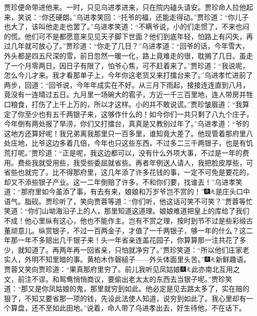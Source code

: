 贾珍便命带进他来。一时，只见乌进孝进来，只在院内磕头请安。贾珍命人拉他起来，笑说：``你还硬朗。''乌进孝笑回：``托爷的福，还能走得动。''贾珍道：``你儿子也大了，该叫他走走也罢了。''乌进孝笑道：``不瞒爷说，小的们走惯了，不来也闷的慌。他们可不是都愿意来见见天子脚下世面？他们到底年轻，怕路上有闪失，再过几年就可放心了。''贾珍道：``你走了几日？''乌进孝道：``回爷的话，今年雪大，外头都是四五尺深的雪，前日忽然一暖一化，路上竟难走的很，耽搁了几日。虽走了一个月零两日，因日子有限了，怕爷心焦，可不赶着来了。''贾珍道：``我说呢，怎么今儿才来。我才看那单子上，今年你这老货又来打擂台来了。''乌进孝忙进前了两步，回道：``回爷说，今年年成实在不好。从三月下雨起，接接连连直到八月，竟没有一连晴过五日。九月里一场碗大的雹子，方近一千三百里地，连人带房并牲口粮食，打伤了上千上万的，所以才这样。小的并不敢说谎。''贾珍皱眉道：``我算定了你至少也有五千两银子来，这够作什么的！如今你们一共只剩了八九个庄子，今年倒有两处报了旱涝，你们又打擂台，真真是又教别过年了。''乌进孝道：``爷的这地方还算好呢！我兄弟离我那里只一百多里，谁知竟大差了。他现管着那府里八处庄地，比爷这边多着几倍，今年也只这些东西，不过多二三千两银子，也是有饥荒打呢。''贾珍道：``正是呢，我这边都可以，没有什么外项大事，不过是一年的费用。费些我就受用些，我受些委屈就省些。再者年例送人请人，我把脸皮厚些，可省些也就完了。比不得那府里，这几年添了许多花钱的事，一定不可免是要花的，却又不添些银子产业。这一二年倒赔了许多，不和你们要，找谁去！''乌进孝笑道：``那府里如今虽添了事，有去有来，娘娘和万岁爷岂不赏的！''{\includegraphics[width=3mm]{../Images/00004}\includegraphics[width=3mm]{../Images/00012}\footnotesize \kaishu 是庄头口中语气。脂砚。}贾珍听了，笑向贾蓉等道：``你们听，他这话可笑不可笑？''贾蓉等忙笑道：``你们山坳海沿子上的人，那里知道这道理。娘娘难道把皇上的库给了我们不成！他心里纵有这心，他也不能作主。岂有不赏之理，按时到节不过是些彩缎古董顽意儿。纵赏银子，不过一百两金子，才值了一千两银子，够一年的什么？这二年那一年不多赔出几千银子来！头一年省亲连盖花园子，你算算那一注共花了多少，就知道了。再两年再一回省亲，只怕就净穷了。''贾珍笑道：``所以他们庄家老实人，外明不知里暗的事。黄柏木作磬槌子------外头体面里头苦。''{\includegraphics[width=3mm]{../Images/00004}\includegraphics[width=3mm]{../Images/00012}\footnotesize \kaishu 新鲜趣语。}贾蓉又笑向贾珍道：``果真那府里穷了。前儿我听见凤姑娘{\includegraphics[width=3mm]{../Images/00004}\includegraphics[width=3mm]{../Images/00012}\footnotesize \kaishu 此亦南北互用之文，前注不谬。}和鸳鸯悄悄商议，要偷出老太太的东西去当银子呢。''贾珍笑道：``那又是你凤姑娘的鬼，那里就穷到如此。他必定是见去路太多了，实在赔的狠了，不知又要省那一项的钱，先设此法使人知道，说穷到如此了。我心里却有一个算盘，还不至如此田地。''说着，命人带了乌进孝出去，好生待他，不在话下。

